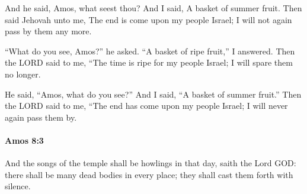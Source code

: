 			\begin{versebox}
					\item[BHS] 
					\item[LXX] 
					\item[ASV] And he said, Amos, what seest thou? And I said, A basket of summer fruit. Then said Jehovah unto me, The end is come upon my people Israel; I will not again pass by them any more.
					\item[NIV] “What do you see, Amos?” he asked. “A basket of ripe fruit,” I answered. Then the LORD said to me, “The time is ripe for my people Israel; I will spare them no longer.
					\item[NRSV] He said, “Amos, what do you see?” And I said, “A basket of summer fruit.” Then the LORD said to me, “The end has come upon my people Israel; I will never again pass them by.
			\end{versebox}

		\paragraph{Amos 8:3} %
			\label{AMOS-8-3}

			And the songs of the temple shall be howlings in that day, saith the Lord GOD: there shall be many dead bodies in every place; they shall cast them forth with silence.

